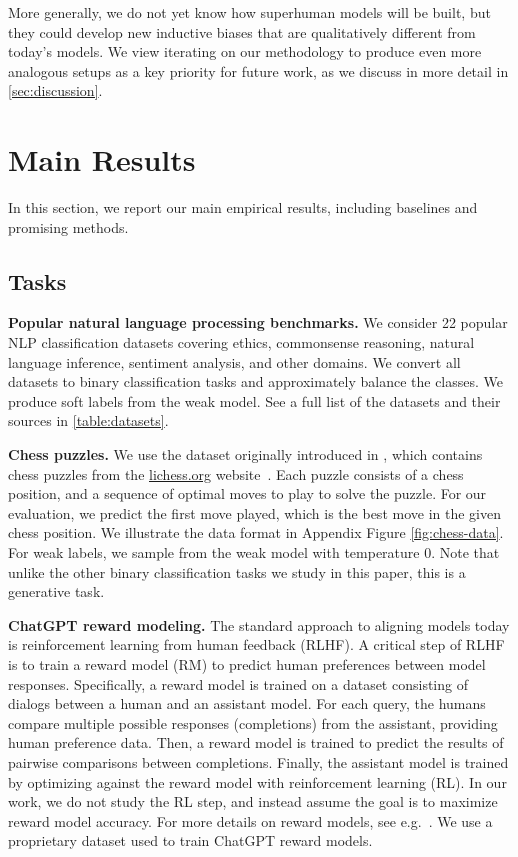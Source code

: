 More generally, we do not yet know how superhuman models will be built, but they could develop new inductive biases that are qualitatively different from today's models. We view iterating on our methodology to produce even more analogous setups as a key priority for future work, as we discuss in more detail in \ref{sec:discussion}. 

\section{Main Results}
\label{sec:results}

In this section, we report our main empirical results, including baselines and promising methods.

\subsection{Tasks}
\label{sec:tasks}

\textbf{Popular natural language processing benchmarks.}\quad
We consider 22 popular NLP classification datasets covering ethics, commonsense reasoning, natural language inference, sentiment analysis, and other domains. We convert all datasets to binary classification tasks and approximately balance the classes. We produce soft labels from the weak model.  See a full list of the datasets and their sources in \ref{table:datasets}.

\textbf{Chess puzzles.}\quad
We use the dataset originally introduced in \citet{schwarzschild2021can}, which contains chess puzzles from the \url{lichess.org} website~\citep{lichess}. Each puzzle consists of a chess position, and a sequence of optimal moves to play to solve the puzzle. For our evaluation, we predict the first move played, which is the best move in the given chess position. We illustrate the data format in Appendix Figure \ref{fig:chess-data}.  For weak labels, we sample from the weak model with temperature 0. Note that unlike the other binary classification tasks we study in this paper, this is a generative task.

\textbf{ChatGPT reward modeling.}\quad
The standard approach to aligning models today is reinforcement learning from human feedback (RLHF). A critical step of RLHF is to train a reward model (RM) to predict human preferences between model responses. Specifically, a reward model is trained on a dataset consisting of dialogs between a human and an assistant model. For each query, the humans compare multiple possible responses (completions) from the assistant, providing human preference data. Then, a reward model is trained to predict the results of pairwise comparisons between completions. Finally, the assistant model is trained by optimizing against the reward model with reinforcement learning (RL).  In our work, we do not study the RL step, and instead assume the goal is to maximize reward model accuracy. For more details on reward models, see e.g.~\citet{ouyang2022training}.  We use a proprietary dataset used to train ChatGPT reward models.

